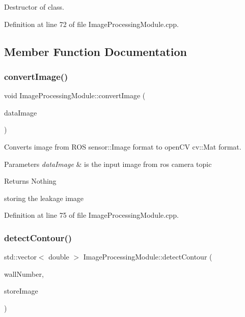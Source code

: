 Destructor of class. 



Definition at line 72 of file Image\+Processing\+Module.\+cpp.



\subsection{Member Function Documentation}
\mbox{\label{class_image_processing_module_aad792e04a69c27e628510d316d6fa0be}} 
\subsubsection{\texorpdfstring{convert\+Image()}{convertImage()}}
{\footnotesize\ttfamily void Image\+Processing\+Module\+::convert\+Image (\begin{DoxyParamCaption}\item[{const sensor\+\_\+msgs\+::\+Image\+::\+Const\+Ptr \&}]{data\+Image }\end{DoxyParamCaption})}



Converts image from R\+OS sensor\+::\+Image format to open\+CV cv\+::\+Mat format. 


\begin{DoxyParams}{Parameters}
{\em data\+Image} & is the input image from ros camera topic\\
\hline
\end{DoxyParams}
\begin{DoxyReturn}{Returns}
Nothing 
\end{DoxyReturn}
storing the leakage image 

Definition at line 75 of file Image\+Processing\+Module.\+cpp.

\mbox{\label{class_image_processing_module_afd8cec561f96d6d5528b641fdb48e43e}} 
\subsubsection{\texorpdfstring{detect\+Contour()}{detectContour()}}
{\footnotesize\ttfamily std\+::vector$<$ double $>$ Image\+Processing\+Module\+::detect\+Contour (\begin{DoxyParamCaption}\item[{std\+::string}]{wall\+Number,  }\item[{int}]{store\+Image }\end{DoxyParamCaption})}



